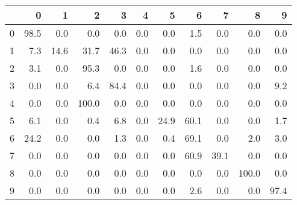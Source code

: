 \begin{tabular}{lrrrrrrrrrr}
\toprule
{} &     0 &     1 &      2 &     3 &    4 &     5 &     6 &     7 &      8 &     9 \\
\midrule
0 &  98.5 &   0.0 &    0.0 &   0.0 &  0.0 &   0.0 &   1.5 &   0.0 &    0.0 &   0.0 \\
1 &   7.3 &  14.6 &   31.7 &  46.3 &  0.0 &   0.0 &   0.0 &   0.0 &    0.0 &   0.0 \\
2 &   3.1 &   0.0 &   95.3 &   0.0 &  0.0 &   0.0 &   1.6 &   0.0 &    0.0 &   0.0 \\
3 &   0.0 &   0.0 &    6.4 &  84.4 &  0.0 &   0.0 &   0.0 &   0.0 &    0.0 &   9.2 \\
4 &   0.0 &   0.0 &  100.0 &   0.0 &  0.0 &   0.0 &   0.0 &   0.0 &    0.0 &   0.0 \\
5 &   6.1 &   0.0 &    0.4 &   6.8 &  0.0 &  24.9 &  60.1 &   0.0 &    0.0 &   1.7 \\
6 &  24.2 &   0.0 &    0.0 &   1.3 &  0.0 &   0.4 &  69.1 &   0.0 &    2.0 &   3.0 \\
7 &   0.0 &   0.0 &    0.0 &   0.0 &  0.0 &   0.0 &  60.9 &  39.1 &    0.0 &   0.0 \\
8 &   0.0 &   0.0 &    0.0 &   0.0 &  0.0 &   0.0 &   0.0 &   0.0 &  100.0 &   0.0 \\
9 &   0.0 &   0.0 &    0.0 &   0.0 &  0.0 &   0.0 &   2.6 &   0.0 &    0.0 &  97.4 \\
\bottomrule
\end{tabular}
